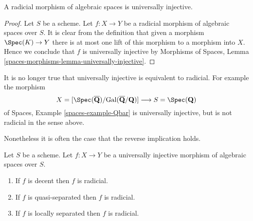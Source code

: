 \begin{lemma}
\label{lemma-radicial-implies-universally-injective}
A radicial morphism of algebraic spaces is universally injective.
\end{lemma}

\begin{proof}
Let $S$ be a scheme. Let $f : X \to Y$ be a radicial
morphism of algebraic spaces over $S$.
It is clear from the definition that given a morphism
$\Spec(K) \to Y$ there is at most one lift of this morphism
to a morphism into $X$. Hence we conclude that $f$ is universally
injective by
Morphisms of Spaces,
Lemma \ref{spaces-morphisms-lemma-universally-injective}.
\end{proof}

\begin{example}
\label{example-universally-injective-not-radicial}
It is no longer true that universally injective is equivalent to radicial.
For example the morphism
$$
X = [\Spec(\overline{\mathbf{Q}})/
\text{Gal}(\overline{\mathbf{Q}}/\mathbf{Q})]
\longrightarrow
S = \Spec(\mathbf{Q})
$$
of
Spaces, Example \ref{spaces-example-Qbar}
is universally injective, but is not radicial in the sense above.
\end{example}

\noindent
Nonetheless it is often the case that the reverse implication holds.

\begin{lemma}
\label{lemma-when-universally-injective-radicial}
Let $S$ be a scheme. Let $f : X \to Y$ be a universally injective
morphism of algebraic spaces over $S$.
\begin{enumerate}
\item If $f$ is decent then $f$ is radicial.
\item If $f$ is quasi-separated then $f$ is radicial.
\item If $f$ is locally separated then $f$ is radicial.
\end{enumerate}
\end{lemma}

